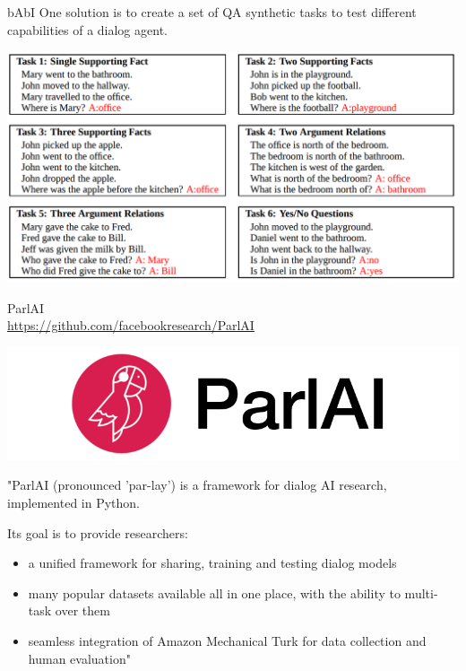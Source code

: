 \documentclass[10pt]{beamer}
\begin{document}
\begin{frame}{bAbI \cite{WestonBCM15}}
One solution is to create a set of QA synthetic tasks to test different capabilities of a dialog agent.


\begin{center}
\includegraphics[scale=0.25]{images/babi.png}
\end{center}
\end{frame}



\begin{frame}{ParlAI \\ \url{https://github.com/facebookresearch/ParlAI}}

\begin{center}
\includegraphics[scale=0.84]{images/parlai.png}
\end{center}

"ParlAI (pronounced 'par-lay') is a framework for dialog AI research, implemented in Python.

Its goal is to provide researchers:

\begin{itemize}
\item a unified framework for sharing, training and testing dialog models
\item many popular datasets available all in one place, with the ability to multi-task over them
\item seamless integration of Amazon Mechanical Turk for data collection and human evaluation"
\end{itemize}

\end{frame}
\end{document}
